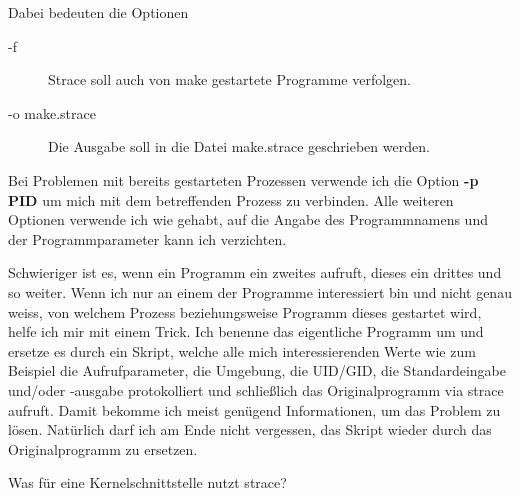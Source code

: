 \begin{normaltext}
  Dabei bedeuten die Optionen

  \begin{description}
    \item[-f] Strace soll auch von make gestartete Programme verfolgen.
    \item[-o make.strace] Die Ausgabe soll in die Datei make.strace
      geschrieben werden.
  \end{description}

  Bei Problemen mit bereits gestarteten Prozessen verwende ich die Option
  {\bf -p PID} um mich mit dem betreffenden Prozess zu verbinden. Alle
  weiteren Optionen verwende ich wie gehabt, auf die Angabe des Programmnamens
  und der Programmparameter kann ich verzichten.

  Schwieriger ist es, wenn ein Programm ein zweites aufruft, dieses ein
  drittes und so weiter. Wenn ich nur an einem der Programme interessiert bin
  und nicht genau weiss, von welchem Prozess beziehungsweise Programm dieses
  gestartet wird, helfe ich mir mit einem Trick. Ich benenne das eigentliche
  Programm um und ersetze es durch ein Skript, welche alle mich
  interessierenden Werte wie zum Beispiel die Aufrufparameter, die Umgebung,
  die UID/GID, die Standardeingabe und/oder -ausgabe protokolliert und
  schließlich das Originalprogramm via strace aufruft.
  Damit bekomme ich meist genügend Informationen, um das Problem zu lösen.
  Natürlich darf ich am Ende nicht vergessen, das Skript wieder durch das
  Originalprogramm zu ersetzen.
\end{normaltext}

\begin{notes}
\item Was für eine Kernelschnittstelle nutzt strace?
\end{notes}




